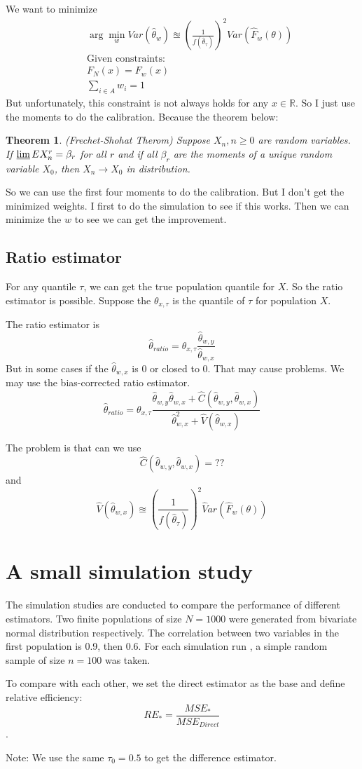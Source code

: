 \documentclass[]{article}
\newtheorem{theorem}{Theorem}
\begin{document}
We want to minimize
\begin{eqnarray}
&& \arg\min_{w} Var\left( \hat\theta_w\right) \approxeq \left(\frac{1}{f(\hat\theta_{\tau})} \right)^2 Var \left(\hat F_w(\theta)\right) \\
&& \text{Given constraints:}\nonumber\\
&& F_N(x)=F_w(x)\nonumber\\
&& \sum_{i\in A} w_i=1\nonumber
\end{eqnarray}
But unfortunately, this constraint is not always holds for any $x\in \mathbb{R}$. So I just use the moments to do the calibration. Because the theorem below:
\begin{theorem}
	(Frechet-Shohat Therom) Suppose ${X_n},n \geq 0$ are random variables. If $\varliminf EX_n^r=\beta_r$ for all $r$ and if all $\beta_r$ are the moments of a unique random variable $X_0$, then $X_n\longrightarrow X_0$ in distribution.
\end{theorem}

So we can use the first four moments to do the calibration. But I don't get the minimized weights.  I first to do the simulation to see if this works. Then we can minimize the $w$ to see we can get the improvement.

\subsection{Ratio estimator}
For any quantile $\tau$, we can get the true population quantile for $X$. So the ratio estimator is possible. Suppose the $\theta_{x,\tau}$ is the quantile of $\tau$ for population $X$.

The ratio estimator is $$ \hat\theta_{ratio}= \theta_{x,\tau}\frac{\hat\theta_{w,y}}{\hat\theta_{w,x}} $$
 But in some cases if the $\hat\theta_{w,x}$ is 0 or closed to 0. That may cause problems.
 We may use the bias-corrected ratio estimator. 
 $$ \hat\theta_{ratio}= \theta_{x,\tau}\frac{\hat\theta_{w,y}\hat\theta_{w,x}+\hat C\left(\hat\theta_{w,y},\hat\theta_{w,x} \right) }{\hat\theta_{w,x}^2+\hat V\left( \hat\theta_{w,x}\right) } $$
 
 The problem is that can we use $$\hat C\left(\hat\theta_{w,y},\hat\theta_{w,x} \right) =??$$
 and $$ \hat  V\left( \hat\theta_{w,x}\right) \approxeq \left(\frac{1}{f(\hat\theta_{\tau})} \right)^2 \hat Var \left(\hat F_w(\theta)\right)$$
 
 \section{A small simulation study}
 The simulation studies are conducted to compare the performance of different estimators. Two finite populations of size $N=1000$ were generated from bivariate normal distribution respectively. The correlation between two variables in the first population is 0.9, then 0.6. For each simulation run , a simple random sample of size $n=100$ was taken.
 
 To compare with each other, we set the direct estimator as the base and define relative efficiency: $$RE_{*}=\frac{MSE_{*}}{MSE_{Direct}}$$.
 
 Note: We use the same $\tau_0=0.5$ to get the difference estimator.
 
 
 
\end{document}
